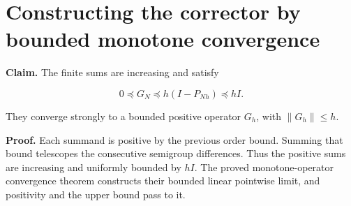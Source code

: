 \documentclass[11pt,a4paper]{article}
\begin{document}
\section{\texorpdfstring{Constructing the corrector by bounded monotone convergence}{Constructing the corrector by bounded monotone convergence}}


\textbf{Claim.} The finite sums are increasing and satisfy

\[0\preceq G_N\preceq h(I-P_{Nh})\preceq hI.\]

They converge strongly to a bounded positive operator \(G_h\), with \(\|G_h\|\le h\).



\textbf{Proof.} Each summand is positive by the previous order bound. Summing that bound telescopes the consecutive semigroup differences. Thus the positive sums are increasing and uniformly bounded by \(hI\). The proved monotone-operator convergence theorem constructs their bounded linear pointwise limit, and positivity and the upper bound pass to it.
\end{document}
